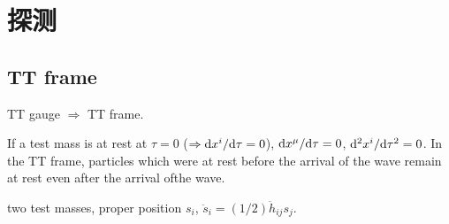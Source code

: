 \chapter{探测}

\section{TT frame}

TT gauge $\Rightarrow$ TT frame.

If a test mass is at rest at $\tau=0$ ($\Rightarrow \mathrm{d} x^i/\mathrm{d}\tau=0$), $\mathrm{d} x^\mu/\mathrm{d}\tau=0$, $\mathrm{d}^2 x^i/\mathrm{d}\tau^2=0$. In the TT frame, particles which were at rest before the arrival of the wave remain at rest even after the arrival ofthe wave.

two test masses, proper position $s_i$, $\ddot{s}_i=(1/2)\ddot{h}_{ij}s_j$.
